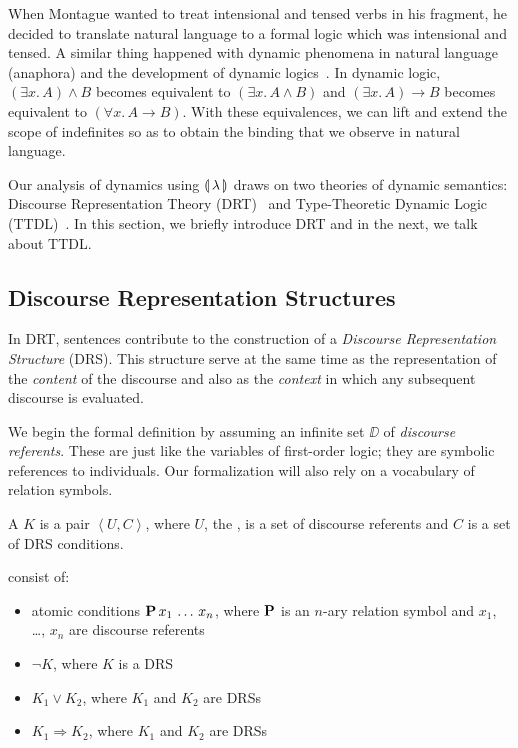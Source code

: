 When Montague wanted to treat intensional and tensed verbs in his fragment,
he decided to translate natural language to a formal logic which was
intensional and tensed. A similar thing happened with dynamic phenomena in
natural language (anaphora) and the development of dynamic
logics~\cite{groenendijk1991dynamic,kamp1993discourse,de2006towards,lebedeva2012expression}. In
dynamic logic, $(\exists x.\, A) \land B$ becomes equivalent to
$(\exists x.\, A \land B)$ and $(\exists x.\, A) \to B$ becomes equivalent
to $(\forall x.\, A \to B)$. With these equivalences, we can lift and
extend the scope of indefinites so as to obtain the binding that we observe
in natural language.

Our analysis of dynamics using ${\llparenthesis \, \lambda \, \rrparenthesis}$ draws on two theories of dynamic
semantics: Discourse Representation Theory (DRT)~\cite{kamp1993discourse}
and Type-Theoretic Dynamic Logic
(TTDL)~\cite{de2006towards,lebedeva2012expression}. In this section, we
briefly introduce DRT and in the next, we talk about TTDL.


\subsection{Discourse Representation Structures}
\label{sec:drt-drses}

In DRT, sentences contribute to the construction of a \emph{Discourse
  Representation Structure} (DRS). This structure serve at the same time as
the representation of the \emph{content} of the discourse and also as the
\emph{context} in which any subsequent discourse is evaluated.

We begin the formal definition by assuming an infinite set $\DD$ of
\emph{discourse referents}. These are just like the variables of
first-order logic; they are symbolic references to individuals. Our
formalization will also rely on a vocabulary of relation symbols.

\begin{definition}
  A  $K$ is a pair
  $\left< U, C \right>$, where $U$, the , is a set of
  discourse referents and $C$ is a set of DRS conditions.

   consist of:
  \begin{itemize}
  \item atomic conditions $\textbf{P}\,x_1\,\ldots\,x_n$, where
    $\textbf{P}$ is an $n$-ary relation symbol and $x_1$, \ldots, $x_n$
    are discourse referents
  \item $\lnot K$, where $K$ is a DRS
  \item $K_1 \lor K_2$, where $K_1$ and $K_2$ are DRSs
  \item $K_1 \Rightarrow K_2$, where $K_1$ and $K_2$ are DRSs
  \end{itemize}
\end{definition}

